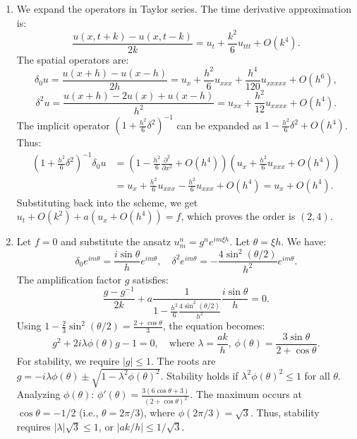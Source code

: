 \begin{solution}
\begin{enumerate}
    \item We expand the operators in Taylor series. The time derivative approximation is:
    \[ \frac{u(x, t+k) - u(x, t-k)}{2k} = u_t + \frac{k^2}{6} u_{ttt} + O(k^4). \]
    The spatial operators are:
    \[ \delta_0 u = \frac{u(x+h) - u(x-h)}{2h} = u_x + \frac{h^2}{6} u_{xxx} + \frac{h^4}{120} u_{xxxxx} + O(h^6), \]
    \[ \delta^2 u = \frac{u(x+h) - 2u(x) + u(x-h)}{h^2} = u_{xx} + \frac{h^2}{12} u_{xxxx} + O(h^4). \]
    The implicit operator $(1 + \frac{h^2}{6} \delta^2)^{-1}$ can be expanded as $1 - \frac{h^2}{6} \delta^2 + O(h^4)$. Thus:
    \begin{align*}
        \left(1 + \frac{h^2}{6} \delta^2\right)^{-1} \delta_0 u &= \left(1 - \frac{h^2}{6} \frac{\partial^2}{\partial x^2} + O(h^4)\right) \left(u_x + \frac{h^2}{6} u_{xxx} + O(h^4)\right) \\
        &= u_x + \frac{h^2}{6} u_{xxx} - \frac{h^2}{6} u_{xxx} + O(h^4) = u_x + O(h^4).
    \end{align*}
    Substituting back into the scheme, we get $u_t + O(k^2) + a(u_x + O(h^4)) = f$, which proves the order is $(2, 4)$.

    \item Let $f=0$ and substitute the ansatz $u_m^n = g^n e^{im\xi h}$. Let $\theta = \xi h$. We have:
    \[ \delta_0 e^{im\theta} = \frac{i \sin \theta}{h} e^{im\theta}, \quad \delta^2 e^{im\theta} = -\frac{4 \sin^2(\theta/2)}{h^2} e^{im\theta}. \]
    The amplification factor $g$ satisfies:
    \[ \frac{g - g^{-1}}{2k} + a \frac{1}{1 - \frac{h^2}{6} \frac{4 \sin^2(\theta/2)}{h^2}} \frac{i \sin \theta}{h} = 0. \]
    Using $1 - \frac{2}{3} \sin^2(\theta/2) = \frac{2 + \cos \theta}{3}$, the equation becomes:
    \[ g^2 + 2i \lambda \phi(\theta) g - 1 = 0, \quad \text{where } \lambda = \frac{ak}{h}, \, \phi(\theta) = \frac{3 \sin \theta}{2 + \cos \theta}. \]
    For stability, we require $|g| \leq 1$. The roots are $g = -i \lambda \phi(\theta) \pm \sqrt{1 - \lambda^2 \phi(\theta)^2}$. Stability holds if $\lambda^2 \phi(\theta)^2 \leq 1$ for all $\theta$. 
    Analyzing $\phi(\theta)$: $\phi'(\theta) = \frac{3(6\cos \theta + 3)}{(2+\cos \theta)^2}$. The maximum occurs at $\cos \theta = -1/2$ (i.e., $\theta = 2\pi/3$), where $\phi(2\pi/3) = \sqrt{3}$.
    Thus, stability requires $|\lambda| \sqrt{3} \leq 1$, or $|ak/h| \leq 1/\sqrt{3}$.
\end{enumerate}
\end{solution}

